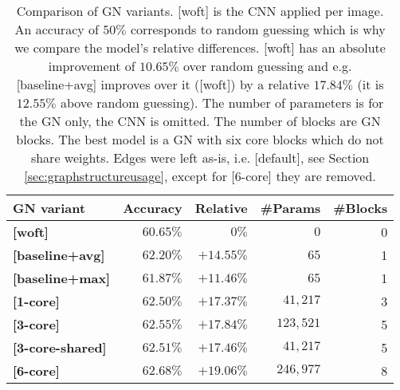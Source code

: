 \begin{table}
    \centering
    \begin{tabular}{lrrrr}
        \textbf{GN variant} & \textbf{Accuracy} & \textbf{Relative} & \textbf{\#Params} & \textbf{\#Blocks}\\\hline
        \textbf{[woft]}         & $60.65\%$ & $0\%$ & $0$ & 0 \\
        \textbf{[baseline+avg]} & $62.20\%$ & $+14.55\%$ & $65$ & 1\\
        \textbf{[baseline+max]} & $61.87\%$ & $+11.46\%$ & $65$ & 1\\
        \textbf{[1-core]}       & $62.50\%$ & $+17.37\%$ & $41,217$ & 3\\
        \textbf{[3-core]}       & $62.55\%$ & $+17.84\%$ & $123,521$ & 5\\
        \textbf{[3-core-shared]}& $62.51\%$ & $+17.46\%$ & $41,217$ & 5\\
        \textbf{[6-core]}       & $\bm{62.68\%}$ & $\bm{+19.06\%}$ & $246,977$ & 8\\
    \end{tabular}
    \caption[Comparison of GN variants]{Comparison of GN variants. [woft] is the CNN applied per image. An accuracy of $50\%$ corresponds to random guessing which is why we compare the model's relative differences. [woft] has an absolute improvement of $10.65\%$ over random guessing and e.g. [baseline+avg] improves over it ([woft]) by a relative $17.84\%$ (it is $12.55\%$ above random guessing). The number of parameters is for the GN only, the CNN is omitted. The number of blocks are GN blocks. The best model is a GN with six core blocks which do not share weights. Edges were left as-is, i.e. [default], see Section \ref{sec:graphstructureusage}, except for [6-core] they are removed.}
    \label{tab:gnvariantscomparison}
\end{table}

